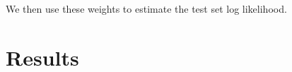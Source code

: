 \documentclass[10pt,letterpaper]{article}
\newcommand{\lorem}{{\bf LOREM}}
\newcommand{\ipsum}{{\bf IPSUM}}
\begin{document}
{\begin{euqation}
We then use these weights to estimate the test set log likelihood.

\section*{Results}
%
%
%
%
%
%

\end{euqation}}
\end{document}
